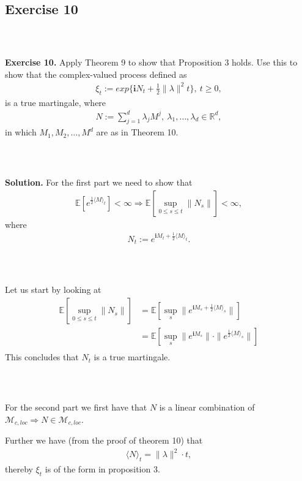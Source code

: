 \documentclass{beamer}
\numberwithin{equation}{section}
\newenvironment{frame2}{\begin{frame}\frametitle{{\normalsize \secname} \\ {\large \subsecname}}}{\end{frame}}
\begin{document}
\subsection{Exercise 10}

\begin{frame2}
    \textbf{Exercise 10.}
    Apply Theorem 9 to show that Proposition 3 holds.
    Use this to show that the complex-valued process defined as
    \begin{align}
        \xi_t := exp\{ \textbf{i}N_t + \frac{1}{2}\| \lambda \|^2 t \}, \ t \geq 0,
    \end{align}
    is a true martingale, where
    \begin{align}
        N := \sum_{j = 1}^d \lambda_j M^j, \ \lambda_1,\ldots,\lambda_d \in \mathbb{R}^d,
    \end{align}
    in which $M_1, M_2, \ldots, M^d$ are as in Theorem 10.
\end{frame2}

\begin{frame2}
    \textbf{Solution.}
    For the first part we need to show that
    \begin{align}
        \mathbb{E}\left[e^{\frac{1}{2}\langle M \rangle_t}\right] < \infty \Rightarrow \mathbb{E}\left[\sup_{0 \leq s \leq t}\| N_s \|\right] < \infty,
    \end{align}
    where
    \begin{align}
        N_t := e^{\textbf{i}M_t + \frac{1}{2}\langle M \rangle_t}.
    \end{align}
\end{frame2}

\begin{frame2}
    Let us start by looking at
    \begin{align}
        \mathbb{E}\left[\sup_{0 \leq s \leq t} \| N_s \| \right] &= \mathbb{E}\left[\sup_s \| e^{\textbf{i}M_s + \frac{1}{2}\langle M \rangle_s} \|\right]\\
        &= \mathbb{E}\left[\sup_s \| e^{\textbf{i}M_s} \| \cdot \|e^{\frac{1}{2}\langle M \rangle_s} \|\right] \\
    \end{align}
    This concludes that $N_t$ is a true martingale. 
\end{frame2}

\begin{frame2}
    For the second part we first have that $N$ is a linear combination of $\mathcal{M}_{c,loc} \Rightarrow N \in \mathcal{M}_{c,loc}$.
    
    \vspace{10pt}
    Further we have (from the proof of theorem 10) that
    \begin{align}
        \langle N \rangle_t = \| \lambda \|^2 \cdot t,
    \end{align}
    thereby $\xi_t$ is of the form in proposition 3.
\end{frame2}
\end{document}
